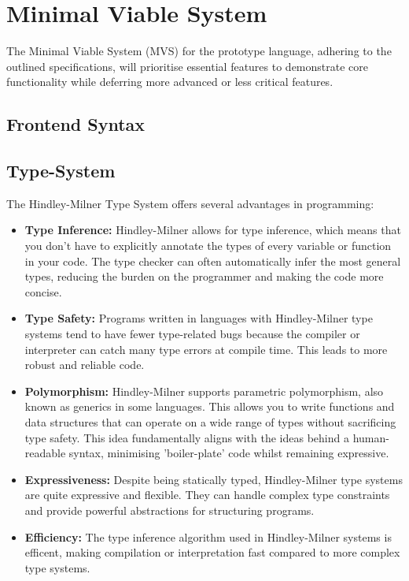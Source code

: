 \documentclass{l4proj}
\begin{document}
\section{Minimal Viable System}

The Minimal Viable System (MVS) for the prototype language, adhering to the outlined specifications, will prioritise essential features to demonstrate core functionality while deferring more advanced or less critical features. 

\subsection{Frontend Syntax}



\subsection{Type-System}
The Hindley-Milner Type System offers several advantages in programming:

\begin{itemize}
    \item \textbf{Type Inference:} Hindley-Milner allows for type inference, which means that you don't have to explicitly annotate the types of every variable or function in your code.
    The type checker can often automatically infer the most general types, reducing the burden on the programmer and making the code more concise.
    \item \textbf{Type Safety:} Programs written in languages with Hindley-Milner type systems tend to have fewer type-related bugs because the compiler or interpreter can catch many type errors at compile time.
    This leads to more robust and reliable code.
    \item \textbf{Polymorphism:} Hindley-Milner supports parametric polymorphism, also known as generics in some languages.
    This allows you to write functions and data structures that can operate on a wide range of types without sacrificing type safety.
    This idea fundamentally aligns with the ideas behind a human-readable syntax, minimising 'boiler-plate' code whilst remaining expressive.
    \item \textbf{Expressiveness:} Despite being statically typed, Hindley-Milner type systems are quite expressive and flexible.
    They can handle complex type constraints and provide powerful abstractions for structuring programs.
    \item \textbf{Efficiency:} The type inference algorithm used in Hindley-Milner systems is efficent, making compilation or interpretation fast compared to more complex type systems.
\end{itemize}
\end{document}
